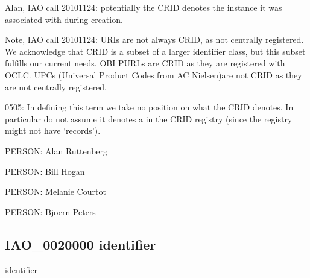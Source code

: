 \documentclass[letterpaper,10pt,english]{sphinxmanual}
\begin{document}
\begin{sphinxShadowBox}

\sphinxAtStartPar
Alan, IAO call 20101124: potentially the CRID denotes the instance it was associated with during creation.

\sphinxAtStartPar
Note, IAO call 20101124: URIs are not always CRID, as not centrally registered. We acknowledge that CRID is a subset of a larger identifier class, but this subset fulfills our current needs. OBI PURLs are CRID as they are registered with OCLC. UPCs (Universal Product Codes from AC Nielsen)are not CRID as they are not centrally registered.

\sphinxhyphen{}05\sphinxhyphen{}05: In defining this term we take no position on what the CRID denotes. In particular do not assume it denotes a  in the CRID registry (since the registry might not have ‘records’).
\end{sphinxShadowBox}

\begin{sphinxShadowBox}

\sphinxAtStartPar
{}
\end{sphinxShadowBox}

\begin{sphinxShadowBox}

\sphinxAtStartPar
PERSON: Alan Ruttenberg

\sphinxAtStartPar
PERSON: Bill Hogan

\sphinxAtStartPar
PERSON: Melanie Courtot

\sphinxAtStartPar
PERSON: Bjoern Peters
\end{sphinxShadowBox}
\begin{quote}

\ignorespaces \end{quote}


\subsection{IAO\_0020000 \sphinxhyphen{} identifier}
\label{\detokenize{doc-IAO_0020000:iao-0020000-identifier}}\label{\detokenize{doc-IAO_0020000:index-0}}\label{\detokenize{doc-IAO_0020000::doc}}
\begin{sphinxShadowBox}

\sphinxAtStartPar
identifier
\end{sphinxShadowBox}
\end{document}
